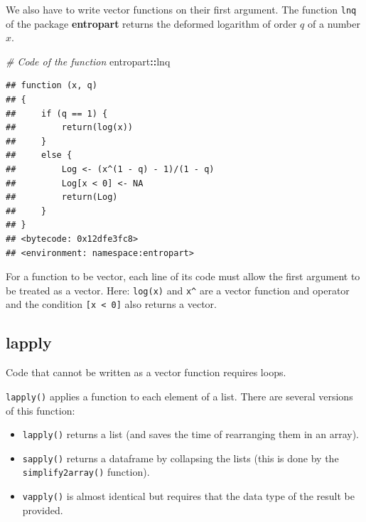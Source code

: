 \documentclass[
  12pt,
  american,
  a4paper,
  extrafontsizes,onecolumn,openright
  ]{memoir}
\newenvironment{Shaded}{\begin{snugshade}}{\end{snugshade}}
\newcommand{\CommentTok}[1]{\textcolor[rgb]{0.56,0.35,0.01}{\textit{#1}}}
\newcommand{\NormalTok}[1]{#1}
\newcommand{\SpecialCharTok}[1]{\textcolor[rgb]{0.81,0.36,0.00}{\textbf{#1}}}
\providecommand{\tightlist}{%
  \setlength{\itemsep}{0pt}\setlength{\parskip}{0pt}}
\begin{document}
\normalsize

We also have to write vector functions on their first argument.
The function \texttt{lnq} of the package \textbf{entropart} returns the deformed logarithm of order \(q\) of a number \(x\).

\scriptsize

\begin{Shaded}
\begin{Highlighting}[]
\CommentTok{\# Code of the function}
\NormalTok{entropart}\SpecialCharTok{::}\NormalTok{lnq}
\end{Highlighting}
\end{Shaded}

\begin{verbatim}
## function (x, q) 
## {
##     if (q == 1) {
##         return(log(x))
##     }
##     else {
##         Log <- (x^(1 - q) - 1)/(1 - q)
##         Log[x < 0] <- NA
##         return(Log)
##     }
## }
## <bytecode: 0x12dfe3fc8>
## <environment: namespace:entropart>
\end{verbatim}

\normalsize

For a function to be vector, each line of its code must allow the first argument to be treated as a vector.
Here: \texttt{log(x)} and \texttt{x\^{}} are a vector function and operator and the condition \texttt{{[}x\ \textless{}\ 0{]}} also returns a vector.

\subsection{lapply}\label{lapply}

Code that cannot be written as a vector function requires loops.

\texttt{lapply()} applies a function to each element of a list.
There are several versions of this function:

\begin{itemize}
\tightlist
\item
  \texttt{lapply()} returns a list (and saves the time of rearranging them in an array).
\item
  \texttt{sapply()} returns a dataframe by collapsing the lists (this is done by the \texttt{simplify2array()} function).
\item
  \texttt{vapply()} is almost identical but requires that the data type of the result be provided.
\end{itemize}

\scriptsize
\end{document}

